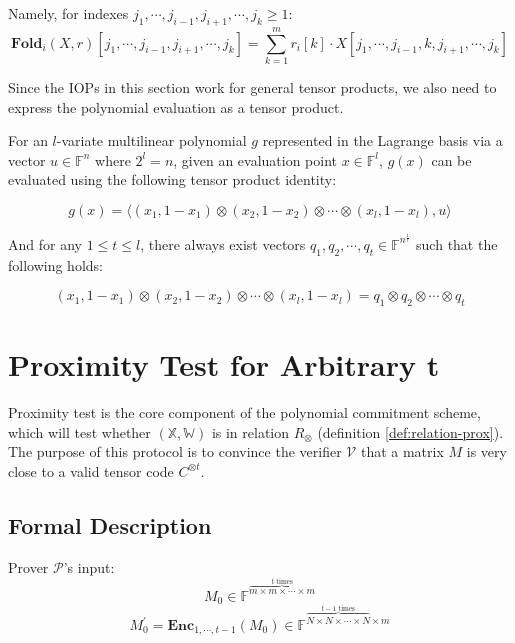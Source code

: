 Namely, for indexes $j_1, \cdots, j_{i-1}, j_{i+1}, \cdots , j_{k} \ge 1$:
$$
\textbf{Fold}_i(X, r)[j_1, \cdots, j_{i-1}, j_{i+1}, \cdots , j_{k}] = \sum_{k=1}^{m} r_{i}[k] \cdot X[j_1, \cdots, j_{i-1}, k, j_{i+1}, \cdots , j_{k}]
$$



Since the IOPs in this section work for general tensor products, we also need to express the polynomial evaluation as a tensor product.

\begin{lemma}
\label{lemma:petq}

For an $l$-variate multilinear polynomial $g$ represented in the Lagrange basis via a vector $u \in \mathbb{F}^{n}$ where $2^l = n$, given an evaluation point $x \in \mathbb{F}^l$, $g(x)$ can be evaluated using the following tensor product identity: 

\[
    g(x) = \langle (x_1, 1-x_1) \otimes (x_2, 1-x_2) \otimes \cdots \otimes (x_l, 1-x_l) , u \rangle
\]

And for any $ 1 \le t  \le l$, there always exist vectors $q_1, q_2, \cdots , q_t \in \mathbb{F}^{n^{\frac{1}{t}}}$ such that the following holds:

\[
    (x_1, 1-x_1) \otimes (x_2, 1-x_2) \otimes \cdots \otimes (x_l, 1-x_l) = q_1 \otimes q_2 \otimes \cdots \otimes q_t
\]

\end{lemma}


\section{Proximity Test for Arbitrary t}

Proximity test is the core component of the polynomial commitment scheme, which will test whether $(\mathbb{X}, \mathbb{W})$ is in relation $R_\otimes$ (definition \ref{def:relation-prox}). The purpose of this protocol is to convince the verifier $\mathcal{V}$ that a matrix $M$ is very close to a valid tensor code $C^{\otimes t}$.

\subsection{Formal Description}

Prover $\mathcal{P}$'s input: 
$$
    M_0 \in \mathbb{F}^{\overbrace{m \times m \times \cdots \times m}^{t \text{ times}}}
$$
$$
    M_0^{\prime} = \textbf{Enc}_{1,\cdots,t-1}(M_0) \in \mathbb{F}^{\overbrace{N \times N \times \cdots \times N}^{t-1 \text{ times}} \times m}
$$

